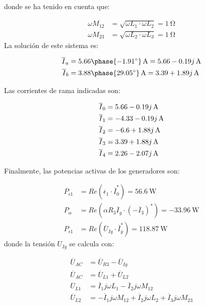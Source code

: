 \documentclass[12pt]{article}
\begin{document}
donde se ha tenido en cuenta que:

\begin{align*}
  \omega M_{12} &= \sqrt{\omega L_1 \cdot \omega L_2} = \SI{1}{\ohm}\\
  \omega M_{23} &= \sqrt{\omega L_2 \cdot \omega L_3} = \SI{1}{\ohm}
\end{align*}
La solución de este sistema es:

\begin{align*}
  \overline{I}_a &= \SI[parse-numbers=false]{5.66\phase{\ang{-1.91}}}{\ampere} = \SI[parse-numbers=false]{5.66 - 0.19j}{\ampere}\\
    \overline{I}_b &= \SI[parse-numbers=false]{3.88\phase{\ang{29.05}}}{\ampere} = \SI[parse-numbers=false]{3.39 + 1.89j}{\ampere}
\end{align*}

Las corrientes de rama indicadas son:

\begin{align*}
  \overline{I}_0 &= \SI[parse-numbers=false]{5.66 - 0.19j}{\ampere}\\
  \overline{I}_1 &= \SI[parse-numbers=false]{-4.33 - 0.19j}{\ampere}\\
  \overline{I}_2 &= \SI[parse-numbers=false]{-6.6 + 1.88j}{\ampere}\\
  \overline{I}_3 &= \SI[parse-numbers=false]{3.39 + 1.88j}{\ampere}\\
  \overline{I}_4 &= \SI[parse-numbers=false]{2.26 - 2.07j}{\ampere}
\end{align*}

Finalmente, las potencias activas de los generadores son:

\begin{align*}
  P_{\epsilon1} &= Re(\overline{\epsilon}_1 \cdot \overline{I}_0^*) = \SI{56.6}{\watt}\\
  P_{\alpha} &= Re(\alpha R_3 \overline{I}_g \cdot (-\overline{I}_3)^*) = \SI{-33.96}{\watt}\\
  P_{\epsilon1} &= Re(\overline{U}_{Ig} \cdot \overline{I}_g^*) = \SI{118.87}{\watt}
\end{align*}
donde la tensión $U_{Ig}$ se calcula con:

\begin{align*}
  \overline{U}_{AC} &= \overline{U}_{R3} - \overline{U}_{Ig}\\
  \overline{U}_{AC} &= \overline{U}_{L1} + \overline{U}_{L2}\\
  \overline{U}_{L1} &= \overline{I}_1 j \omega L_1 - \overline{I}_2 j \omega M_{12}\\
  \overline{U}_{L2} &= - \overline{I}_1 j \omega M_{12} + \overline{I}_2 j \omega L_2 + \overline{I}_3 j \omega M_{23}
\end{align*}
  
\end{document}
